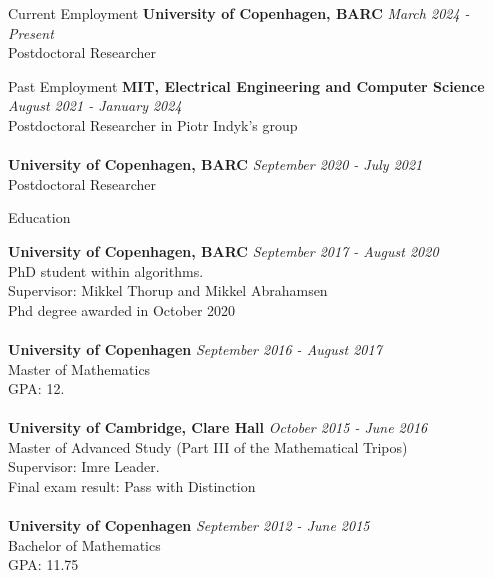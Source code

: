 \documentclass{resume} %
\begin{document}


\begin{rSection}{Current Employment}
{\bf University of Copenhagen, BARC} \hfill {\em March 2024 - Present} 
\\ Postdoctoral Researcher


\end{rSection}

\begin{rSection}{Past Employment}
{\bf MIT, Electrical Engineering and Computer Science} \hfill {\em August 2021 - January 2024} 
\\ Postdoctoral Researcher in Piotr Indyk's group \\ \\
{\bf University of Copenhagen, BARC} \hfill {\em September 2020 - July 2021} 
\\ Postdoctoral Researcher


\end{rSection}



\begin{rSection}{Education}

{\bf University of Copenhagen, BARC} \hfill {\em September 2017 - August 2020} 
\\ PhD student within algorithms. \\Supervisor: Mikkel Thorup and Mikkel Abrahamsen
\\ Phd degree awarded in October 2020\\
\\{\bf University of Copenhagen} \hfill {\em September 2016 - August 2017}  
\\ Master of Mathematics 
\\ GPA: 12. \\
\\{\bf University of Cambridge, Clare Hall} \hfill {\em October 2015 - June 2016} 
\\ Master of Advanced Study (Part III of the Mathematical Tripos)
\\ Supervisor: Imre Leader. 
\\ Final exam result: Pass with Distinction \\
\\{\bf University of Copenhagen} \hfill {\em September 2012 - June 2015} 
\\ Bachelor of Mathematics
\\ GPA: 11.75 
\end{rSection}
\end{document}
